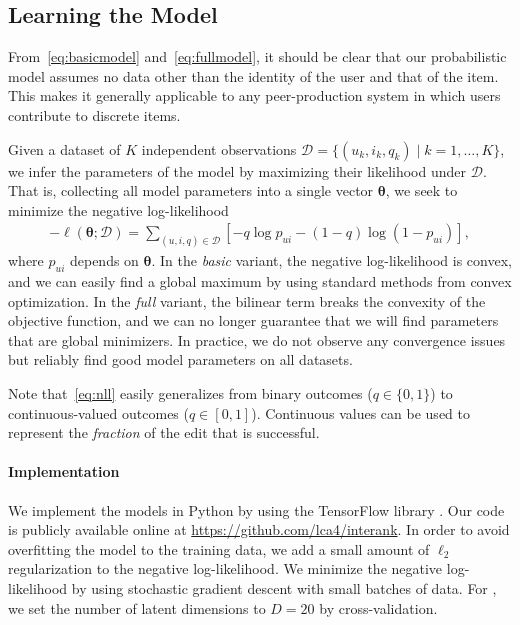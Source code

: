 \subsection{Learning the Model}
\label{sec:learning}

From~\eqref{eq:basicmodel} and~\eqref{eq:fullmodel}, it should be clear that our probabilistic model assumes no data other than the identity of the user and that of the item.
This makes it generally applicable to any peer-production system in which users contribute to discrete items.

Given a dataset of $K$ independent observations $\mathcal{D} = \{ (u_k, i_k, q_k) \mid k = 1, \ldots, K \}$, we infer the parameters of the model by maximizing their likelihood under $\mathcal{D}$.
That is, collecting all model parameters into a single vector $\bm{\theta}$, we seek to minimize the negative log-likelihood
\begin{align}
\label{eq:nll}
- \ell (\bm{\theta} ; \mathcal{D}) = \sum_{(u,i,q) \in \mathcal{D}} \left[ -q \log p_{ui} - (1 - q) \log (1 - p_{ui}) \right],
\end{align}
where $p_{ui}$ depends on $\bm{\theta}$.
In the \emph{basic} variant, the negative log-likelihood is convex, and we can easily find a global maximum by using standard methods from convex optimization.
In the \emph{full} variant, the bilinear term breaks the convexity of the objective function, and we can no longer guarantee that we will find parameters that are global minimizers.
In practice, we do not observe any convergence issues but reliably find good model parameters on all datasets.

Note that~\eqref{eq:nll} easily generalizes from binary outcomes ($q \in \{0, 1\}$) to continuous-valued outcomes ($q \in [0, 1]$).
Continuous values can be used to represent the \emph{fraction} of the edit that is successful.

\paragraph{Implementation}
We implement the models in Python by using the TensorFlow library \citep{abadi2016tensorflow}.
Our code is publicly available online at \url{https://github.com/lca4/interank}.
In order to avoid overfitting the model to the training data, we add a small amount of $\ell_2$ regularization to the negative log-likelihood.
We minimize the negative log-likelihood by using stochastic gradient descent \citep{bishop2006pattern} with small batches of data.
For , we set the number of latent dimensions to $D = 20$ by cross-validation.

